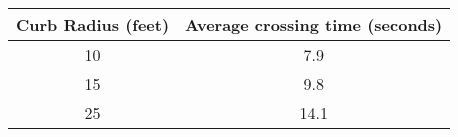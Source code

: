 \begin{table}[h]
\centering
    \begin{tabular}{cc}
    Curb Radius (feet) & Average crossing time (seconds) \\ \hline
    10                 & \phantom{0}7.9                             \\
    15                 & \phantom{0}9.8                             \\
    25                 & 14.1                            \\
    \end{tabular}
\end{table}